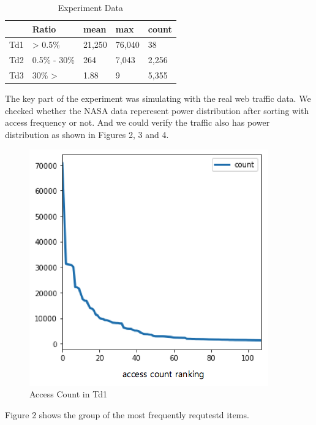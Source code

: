 \documentclass[sigconf,anonymous=true]{acmart}
\begin{document}
\begin{itemize}
\begin{table}[H]
  \caption{Experiment Data}
    \begin{tabular}{| l | l | l | l | l | }
    \hline
    & Ratio & mean & max & count \\ \hline
    Td1 &  > 0.5\% & 21,250 & 76,040 & 38 \\ 
    Td2 & 0.5\% - 30\% & 264 & 7,043 & 2,256 \\
    Td3 & 30\% > & 1.88 & 9 & 5,355 \\ \hline
    \end{tabular}
\end{table}
The key part of the experiment was simulating with the real web traffic data. We checked whether the NASA data reperesent power distribution after sorting with access frequency or not. And we could verify the traffic also has power distribution as shown in Figures 2, 3 and 4.
\end{itemize}

\begin{figure}[H]
    \centering
    \includegraphics[width=0.85\columnwidth]{figs/figure_02_td1.png}
    \caption{Access Count in Td1}
    \label{fig:fig3}
\end{figure}
Figure 2 shows the group of the most frequently requtestd items. 
\end{document}
